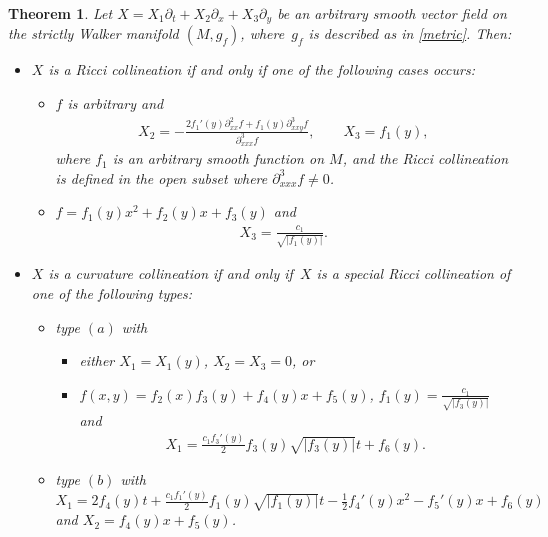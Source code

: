 \documentclass[pdftex]{sigma}
\numberwithin{equation}{section}
\newtheorem{Theorem}{Theorem}[section]
\begin{document}
\begin{Theorem}\label{RicciCol}
Let $X=X_1\partial_t+X_2\partial_x+X_3\partial_y$ be an arbitrary smooth vector field on the strictly Walker manifold $(M,g_f)$, where~$g_f$ is described as in \eqref{metric}. Then:
\begin{itemize}\itemsep=0pt
\item[$i)$] $X$ is a Ricci collineation if and only if one of the following cases occurs:
\begin{itemize}\itemsep=0pt
\item[$(a)$] $f$ is arbitrary and
\begin{gather*}X_2=-\frac{2f_1 '(y)\partial_{xx}^2f+f_1(y)\partial_{xxy}^3f}{\partial_{xxx}^3f}, \qquad X_3=f_1(y),\end{gather*}
where $f_1$ is an arbitrary smooth function on $M$, and the Ricci collineation is defined in the open subset where $\partial_{xxx}^3f \neq 0$.
\item[$(b)$] $f=f_1(y)x^2+f_2(y)x+f_3(y)$ and \begin{gather*}X_3=\frac{c_1}{\sqrt{|f_1(y)|}}.\end{gather*}
\end{itemize}

\item[$ii)$] $X$ is a curvature collineation if and only if~$X$ is a special Ricci collineation of one of the following types:
\begin{itemize}\itemsep=0pt
\item[$(a)^\prime$] type $(a)$ with
\begin{itemize}\itemsep=0pt
\item[$\bullet$] either $X_1=X_1 (y)$, $X_2=X_3=0$, or
\item[$\bullet$] $f(x,y)=f_2(x)f_3(y)+f_4(y)x+f_5(y)$, $f_1(y)=\frac{c_1}{\sqrt{|f_3(y)|}}$ and
\begin{gather*} X_1=\frac{c_1f_3 '(y)}2f_3(y)\sqrt{|f_3(y)|}t+f_6(y).\end{gather*}
\end{itemize}

\item[$(b)^\prime$] type $(b)$ with $X_1=2f_4(y)t+\frac{c_1f_1 '(y)}2f_1(y)\sqrt{|f_1(y)|}t-\frac12f_4 '(y) x^2-f_5 '(y) x+f_6(y)$ and $X_2=f_4(y)x+f_5(y)$.
\end{itemize}
\end{itemize}
\end{Theorem}
\end{document}
